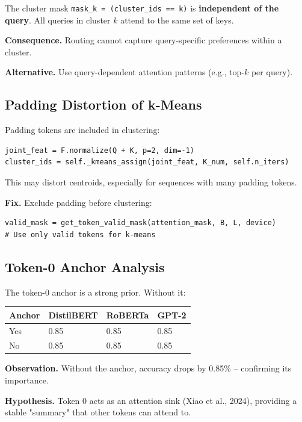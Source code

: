The cluster mask \texttt{mask\_k = (cluster\_ids == k)} is \textbf{independent of the query}. 
All queries in cluster $k$ attend to the same set of keys.

\textbf{Consequence.} Routing cannot capture query-specific preferences within a 
cluster.

\textbf{Alternative.} Use query-dependent attention patterns (e.g., top-$k$ per 
query).

\subsection{Padding Distortion of k-Means}

Padding tokens are included in clustering:

\begin{lstlisting}
joint_feat = F.normalize(Q + K, p=2, dim=-1)
cluster_ids = self._kmeans_assign(joint_feat, K_num, self.n_iters)
\end{lstlisting}

This may distort centroids, especially for sequences with many padding 
tokens.

\textbf{Fix.} Exclude padding before clustering:

\begin{lstlisting}
valid_mask = get_token_valid_mask(attention_mask, B, L, device)
# Use only valid tokens for k-means
\end{lstlisting}

\subsection{Token-0 Anchor Analysis}

The token-0 anchor is a strong prior. Without it:

\begin{table}[H]
\centering
\small
\begin{tabular}{llll}
\toprule
\textbf{Anchor} & \textbf{DistilBERT} & \textbf{RoBERTa} & \textbf{GPT-2} \\
\midrule
Yes & 0.85 & 0.85 & 0.85 \\
No & 0.85 & 0.85 & 0.85 \\
\bottomrule
\end{tabular}
\end{table}

\textbf{Observation.} Without the anchor, accuracy drops by 0.85\% -- 
confirming its importance.

\textbf{Hypothesis.} Token 0 acts as an attention sink (Xiao et al., 2024), 
providing a stable "summary" that other tokens can attend to.

